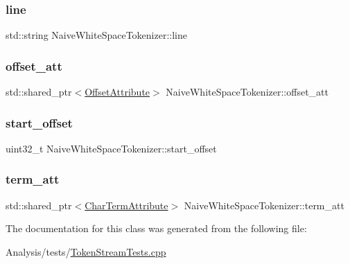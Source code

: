 \subsubsection{\texorpdfstring{line}{line}}
{\footnotesize\ttfamily std\+::string Naive\+White\+Space\+Tokenizer\+::line}

\mbox{\label{classNaiveWhiteSpaceTokenizer_a45e026472fc925608372e2881d1db2f2}} 
\subsubsection{\texorpdfstring{offset\+\_\+att}{offset\_att}}
{\footnotesize\ttfamily std\+::shared\+\_\+ptr$<$\mbox{\hyperlink{classlucene_1_1core_1_1analysis_1_1tokenattributes_1_1OffsetAttribute}{Offset\+Attribute}}$>$ Naive\+White\+Space\+Tokenizer\+::offset\+\_\+att}

\mbox{\label{classNaiveWhiteSpaceTokenizer_a94597a26813f5ac60aa3825bf57c20d8}} 
\subsubsection{\texorpdfstring{start\+\_\+offset}{start\_offset}}
{\footnotesize\ttfamily uint32\+\_\+t Naive\+White\+Space\+Tokenizer\+::start\+\_\+offset}

\mbox{\label{classNaiveWhiteSpaceTokenizer_ad2b2c7263641059662c19db8a3da72a9}} 
\subsubsection{\texorpdfstring{term\+\_\+att}{term\_att}}
{\footnotesize\ttfamily std\+::shared\+\_\+ptr$<$\mbox{\hyperlink{classlucene_1_1core_1_1analysis_1_1tokenattributes_1_1CharTermAttribute}{Char\+Term\+Attribute}}$>$ Naive\+White\+Space\+Tokenizer\+::term\+\_\+att}



The documentation for this class was generated from the following file\+:\begin{DoxyCompactItemize}
\item 
Analysis/tests/\mbox{\hyperlink{TokenStreamTests_8cpp}{Token\+Stream\+Tests.\+cpp}}\end{DoxyCompactItemize}
